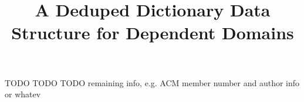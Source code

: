 \documentclass[nonacm]{acmart}
\theoremstyle{slplain}
\numberwithin{thm}{section}
\begin{document}
\title{A Deduped Dictionary Data Structure for Dependent Domains}




TODO TODO TODO remaining info, e.g. ACM member number and author info or whatev





\maketitle
\thispagestyle{empty} %
\end{document}
